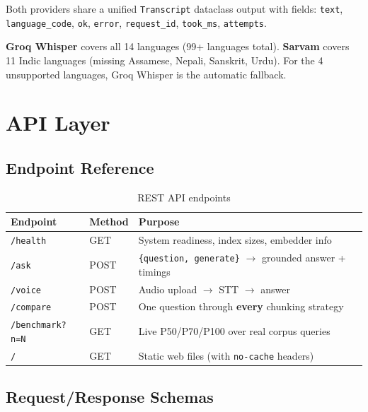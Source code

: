 \documentclass[12pt,a4paper]{article}
\begin{document}
Both providers share a unified \texttt{Transcript} dataclass output with fields: \texttt{text}, \texttt{language\_code}, \texttt{ok}, \texttt{error}, \texttt{request\_id}, \texttt{took\_ms}, \texttt{attempts}.

\begin{importantbox}
\textbf{Groq Whisper} covers all 14 languages (99+ languages total). \textbf{Sarvam} covers 11 Indic languages (missing Assamese, Nepali, Sanskrit, Urdu). For the 4 unsupported languages, Groq Whisper is the automatic fallback.
\end{importantbox}


\section{API Layer}

\subsection{Endpoint Reference}

\begin{table}[H]
\centering
\begin{tabularx}{\textwidth}{l l X}
\toprule
\textbf{Endpoint} & \textbf{Method} & \textbf{Purpose} \\
\midrule
\texttt{/health}         & GET  & System readiness, index sizes, embedder info \\
\texttt{/ask}            & POST & \texttt{\{question, generate\}} $\to$ grounded answer + timings \\
\texttt{/voice}          & POST & Audio upload $\to$ STT $\to$ answer \\
\texttt{/compare}        & POST & One question through \textbf{every} chunking strategy \\
\texttt{/benchmark?n=N}  & GET  & Live P50/P70/P100 over real corpus queries \\
\texttt{/}               & GET  & Static web files (with \texttt{no-cache} headers) \\
\bottomrule
\end{tabularx}
\caption{REST API endpoints}
\end{table}

\subsection{Request/Response Schemas}
\end{document}
